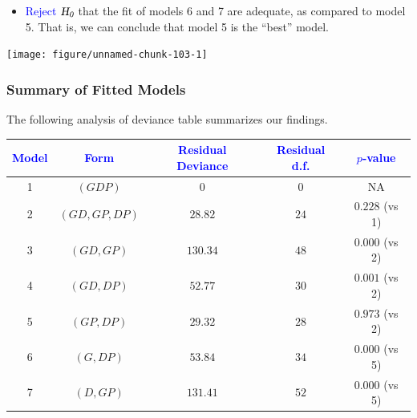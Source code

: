 \documentclass[oneside]{book}\usepackage[]{graphicx}\usepackage[svgnames]{xcolor}
\newenvironment{knitrout}{}{} %
\newcommand{\HN}{\textsl{H}_{\textsl{0}}}%
\begin{document}
\begin{itemize}
    \item \textcolor{Blue}{Reject} $ \HN $ that the fit of models 6 and 7 are adequate, as compared to model 5. That is,
          we can conclude that model 5 is the ``best'' model.
\end{itemize}
\begin{knitrout}
\color{fgcolor}

{\centering \texttt{[image: figure/unnamed-chunk-103-1]} 

}


\end{knitrout}
\subsubsection*{Summary of Fitted Models}
The following analysis of deviance table summarizes our findings.
\begin{table}[H]
    \centering
    \begin{tabular}{ccccc}
        \toprule
        \textcolor{Blue}{Model} & \textcolor{Blue}{Form} & \textcolor{Blue}{Residual Deviance} & \textcolor{Blue}{Residual d.f.} & \textcolor{Blue}{$ p $-value} \\
        \midrule
        1                       & $ (GDP) $              & 0                                   & 0                               & NA                            \\
        \midrule
        2                       & $(GD, GP, DP)$         & $28.82$                             & $24$                            & $0.228$ (vs 1)                \\
        \midrule
        3                       & $(GD, GP)$             & $130.34$                            & $48$                            & $0.000$ (vs 2)                \\
        4                       & $(GD, DP)$             & $52.77$                             & $30$                            & $0.001$ (vs 2)                \\
        5                       & $(GP, DP)$             & $29.32$                             & $28$                            & $0.973$ (vs 2)                \\
        \midrule
        6                       & $(G, DP)$              & $53.84$                             & $34$                            & $0.000$ (vs 5)                \\
        7                       & $(D, GP)$              & $131.41$                            & $52$                            & $0.000$ (vs 5)                \\
        \bottomrule
    \end{tabular}
\end{table}
\end{document}

